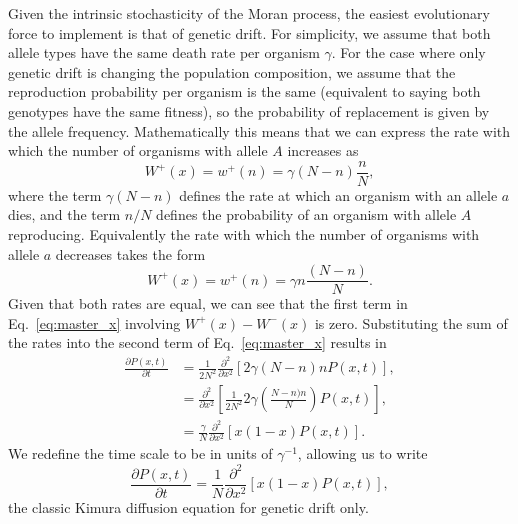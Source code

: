 Given the intrinsic stochasticity of the Moran process, the easiest evolutionary
force to implement is that of genetic drift. For simplicity, we assume that both
allele types have the same death rate per organism $\gamma$. For the case where
only genetic drift is changing the population composition, we assume that the
reproduction probability per organism is the same (equivalent to saying both
genotypes have the same fitness), so the probability of replacement is given by
the allele frequency. Mathematically this means that we can express the rate
with which the number of organisms with allele $A$ increases as
\begin{equation}
    W^+(x) = w^+(n) = \gamma (N-n) \frac{n}{N},
\end{equation}
where the term $\gamma (N-n)$ defines the rate at which an organism with an
allele $a$ dies, and the term $n/N$ defines the probability of an organism with
allele $A$ reproducing. Equivalently the rate with which the number of organisms
with allele $a$ decreases takes the form
\begin{equation}
    W^+(x) = w^+(n) = \gamma n \frac{(N-n)}{N}.
\end{equation}
Given that both rates are equal, we can see that the first term in
Eq.~\ref{eq:master_x} involving $W^+(x) - W^-(x)$ is zero. Substituting the sum
of the rates into the second term of Eq.~\ref{eq:master_x} results in
\begin{equation}
\begin{aligned}
    \frac{\partial P(x, t)}{\partial t} &=\frac{1}{2 N^{2}} 
    \frac{\partial^{2}}{\partial x^{2}}[2 \gamma(N-n) n P(x, t)], \\
    &=\frac{\partial^{2}}{\partial x^{2}}
    \left[\frac{1}{2 N^{2}} 2 \gamma\left(\frac{N-n) n}{N} \right) P(x, t)\right],\\
    &=\frac{\gamma}{N} \frac{\partial^{2}}{\partial x^{2}}[x(1-x) P(x, t)].
\end{aligned}
\end{equation}
We redefine the time scale to be in units of $\gamma^{-1}$, allowing us to write
\begin{equation}
    \frac{\partial P(x, t)}{\partial t} =
    \frac{1}{N} \frac{\partial^{2}}{\partial x^{2}}[x(1-x) P(x, t)],
\end{equation}
the classic Kimura diffusion equation for genetic drift only.